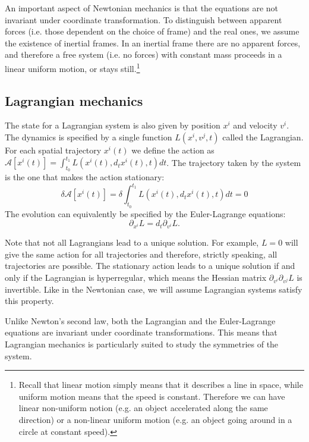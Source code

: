 An important aspect of Newtonian mechanics is that the equations are not invariant under coordinate transformation. To distinguish between apparent forces (i.e. those dependent on the choice of frame) and the real ones, we assume the existence of inertial frames. In an inertial frame there are no apparent forces, and therefore a free system (i.e. no forces) with constant mass proceeds in a linear uniform motion, or stays still.\footnote{Recall that linear motion simply means that it describes a line in space, while uniform motion means that the speed is constant. Therefore we can have linear non-uniform notion (e.g. an object accelerated along the same direction) or a non-linear uniform motion (e.g. an object going around in a circle at constant speed).}

\subsection{Lagrangian mechanics}

The state for a Lagrangian system is also given by position $x^i$ and velocity $v^i$. The dynamics is specified by a single function $L(x^i, v^j, t)$ called the Lagrangian. For each spatial trajectory $x^i(t)$ we define the action as $\mathcal{A}[x^i(t)] = \int_{t_0}^{t_1} L(x^i(t), d_t x^i(t), t) dt$. The trajectory taken by the system is the one that makes the action stationary:
\begin{equation}
\delta \mathcal{A}[x^i(t)] = \delta \int_{t_0}^{t_1} L\left(x^i(t), d_t x^i(t), t\right) dt=0
\end{equation}
The evolution can equivalently be specified by the Euler-Lagrange equations:
\begin{equation}\label{rp-cm-EulerLagrange}
	\partial_{x^i}L=d_t \partial_{v^i} L.
\end{equation}

Note that not all Lagrangians lead to a unique solution. For example, $L=0$ will give the same action for all trajectories and therefore, strictly speaking, all trajectories are possible. The stationary action leads to a unique solution if and only if the Lagrangian is hyperregular, which means the Hessian matrix $\partial_{v^i}\partial_{v^j} L$ is invertible. Like in the Newtonian case, we will assume Lagrangian systems satisfy this property.

Unlike Newton's second law, both the Lagrangian and the Euler-Lagrange equations are invariant under coordinate transformations. This means that Lagrangian mechanics is particularly suited to study the symmetries of the system.

